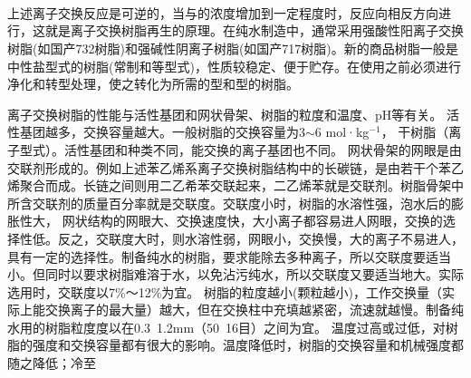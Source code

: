 {\centering
{}\\
\\
\\}

上述离子交换反应是可逆的，当与的浓度增加到一定程度时，反应向相反方向进行，这就是离子交换树脂再生的原理。在纯水制造中，通常采用强酸性阳离子交换树脂(如国产732树脂)和强碱性阴离子树脂(如国产717树脂)。新的商品树脂一般是中性盐型式的树脂(常制和等型式)，性质较稳定、便于贮存。在使用之前必须进行净化和转型处理，使之转化为所需的型和型的树脂。

离子交换树脂的性能与活性基团和网状骨架、树脂的粒度和温度、pH等有关。
 活性基团越多，交换容量越大。一般树脂的交换容量为3$\sim$6 mol·kg$^{-1}$，
干树脂（离子型式）。活性基团和种类不同，能交换的离子基团也不同。
网状骨架的网眼是由交联剂形成的。例如上述苯乙烯系离子交换树脂结构中的长碳链，是由若干个苯乙烯聚合而成。长链之间则用二乙希苯交联起来，二乙烯苯就是交联剂。树脂骨架中所含交联剂的质量百分率就是交联度。交联度小时，树脂的水溶性强，泡水后的膨胀性大， 网状结构的网眼大、交换速度快，大小离子都容易进人网眼，交换的选择性低。反之，交联度大时，则水溶性弱，网眼小，交换慢，大的离子不易进人，具有一定的选择性。制备纯水的树脂，要求能除去多种离子，所以交联度要适当小。但同时以要求树脂难溶于水，以免沾污纯水，所以交联度又要适当地大。实际选用时，交联度以7\%～12\%为宜。
树脂的粒度越小(颗粒越小)，工作交换量（实际上能交换离子的最大量）越大，但在交换柱中充填越紧密，流速就越慢。制备纯水用的树脂粒度度以在0.3~1.2mm（50~16目）之间为宜。
温度过高或过低，对树脂的强度和交换容量都有很大的影响。温度降低时，树脂的交换容量和机械强度都随之降低；冷至